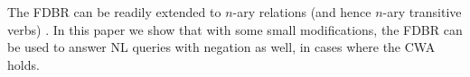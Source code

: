 \documentclass[../main.tex]{subfiles}
\begin{document}
\begin{refsection}
The FDBR can be readily extended to $n$-ary relations (and hence $n$-ary transitive verbs) \cite{peelar2020compositional}. In this paper we show that with some small modifications, the FDBR can be used to answer NL queries with negation as well, in cases where the CWA holds.
%
%

%
%


\end{refsection}
\end{document}
